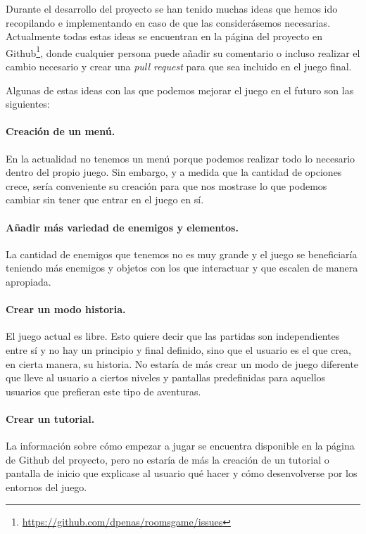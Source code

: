 Durante el desarrollo del proyecto se han tenido muchas ideas que hemos ido recopilando e implementando en caso de que las considerásemos necesarias. Actualmente todas estas ideas se encuentran en la página del proyecto en Github\footnote{\url{https://github.com/dpenas/roomsgame/issues}}, donde cualquier persona puede añadir su comentario o incluso realizar el cambio necesario y crear una \textit{pull request} para que sea incluido en el juego final.

Algunas de estas ideas con las que podemos mejorar el juego en el futuro son las siguientes: 

\paragraph{Creación de un menú.} En la actualidad no tenemos un menú porque podemos realizar todo lo necesario dentro del propio juego. Sin embargo, y a medida que la cantidad de opciones crece, sería conveniente su creación para que nos mostrase lo que podemos cambiar sin tener que entrar en el juego en sí.

\paragraph{Añadir más variedad de enemigos y elementos.} La cantidad de enemigos que tenemos no es muy grande y el juego se beneficiaría teniendo más enemigos y objetos con los que interactuar y que escalen de manera apropiada.

\paragraph{Crear un modo historia.} El juego actual es libre. Esto quiere decir que las partidas son independientes entre sí y no hay un principio y final definido, sino que el usuario es el que crea, en cierta manera, su historia. 
No estaría de más crear un modo de juego diferente que lleve al usuario a ciertos niveles y pantallas predefinidas para aquellos usuarios que prefieran este tipo de aventuras. 

\paragraph{Crear un tutorial.} La información sobre cómo empezar a jugar se encuentra disponible en la página de Github del proyecto, pero no estaría de más la creación de un tutorial o pantalla de inicio que explicase al usuario qué hacer y cómo desenvolverse por los entornos del juego.

